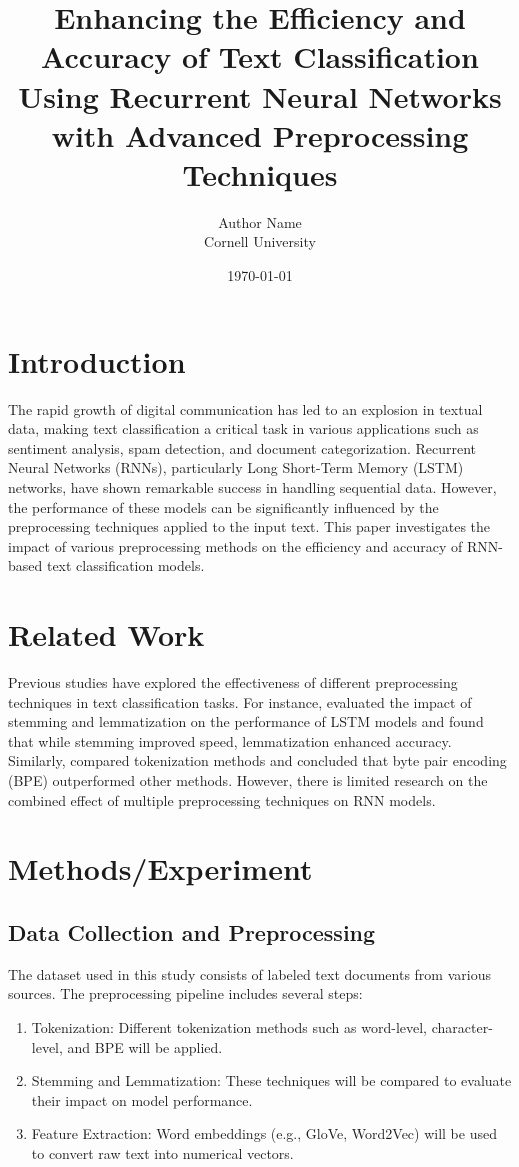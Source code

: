 \documentclass{article}
\title{Enhancing the Efficiency and Accuracy of Text Classification Using Recurrent Neural Networks with Advanced Preprocessing Techniques}
\author{Author Name \\ Cornell University}
\date{\today}
\begin{document}
\maketitle

\section{Introduction}
The rapid growth of digital communication has led to an explosion in textual data, making text classification a critical task in various applications such as sentiment analysis, spam detection, and document categorization. Recurrent Neural Networks (RNNs), particularly Long Short-Term Memory (LSTM) networks, have shown remarkable success in handling sequential data. However, the performance of these models can be significantly influenced by the preprocessing techniques applied to the input text. This paper investigates the impact of various preprocessing methods on the efficiency and accuracy of RNN-based text classification models.

\section{Related Work}
Previous studies have explored the effectiveness of different preprocessing techniques in text classification tasks. For instance, \cite{Li2019} evaluated the impact of stemming and lemmatization on the performance of LSTM models and found that while stemming improved speed, lemmatization enhanced accuracy. Similarly, \cite{Chen2020} compared tokenization methods and concluded that byte pair encoding (BPE) outperformed other methods. However, there is limited research on the combined effect of multiple preprocessing techniques on RNN models.

\section{Methods/Experiment}
\subsection{Data Collection and Preprocessing}
The dataset used in this study consists of labeled text documents from various sources. The preprocessing pipeline includes several steps:
\begin{enumerate}
    \item Tokenization: Different tokenization methods such as word-level, character-level, and BPE will be applied.
    \item Stemming and Lemmatization: These techniques will be compared to evaluate their impact on model performance.
    \item Feature Extraction: Word embeddings (e.g., GloVe, Word2Vec) will be used to convert raw text into numerical vectors.
\end{enumerate}
\end{document}
